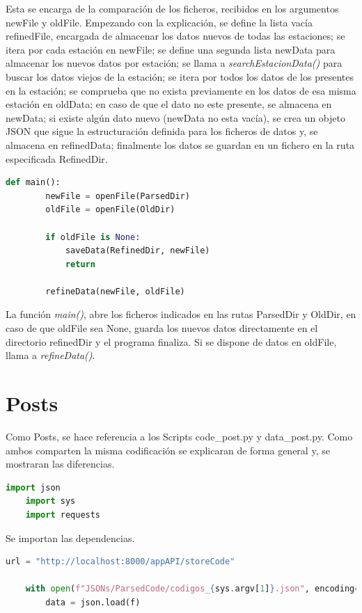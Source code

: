 Esta se encarga de la comparación de los ficheros, recibidos en los argumentos newFile y oldFile.\newline
\newline
Empezando con la explicación, se define la lista vacía refinedFile, encargada de almacenar los datos nuevos de todas las estaciones; se itera por cada estación en newFile; se define una segunda lista newData para almacenar los nuevos datos por estación; se llama a \textit{searchEstacionData()} para buscar los datos viejos de la estación; se itera por todos los datos de los presentes en la estación; se comprueba que no exista previamente en los datos de esa misma estación en oldData; en caso de que el dato no este presente, se almacena en newData; si existe algún dato nuevo (newData no esta vacía), se crea un objeto JSON que sigue la estructuración definida para los ficheros de datos y, se almacena en refinedData; finalmente los datos se guardan en un fichero en la ruta especificada RefinedDir.

\begin{lstlisting}[language=Python, caption={Declaración rutas JSONs}]
	def main():
		newFile = openFile(ParsedDir)
		oldFile = openFile(OldDir)
		
		if oldFile is None:
			saveData(RefinedDir, newFile)
			return
		
		refineData(newFile, oldFile)
\end{lstlisting}

La función \textit{main()}, abre los ficheros indicados en las rutas ParsedDir y OldDir, en caso de que oldFile sea None, guarda los nuevos datos directamente en el directorio refinedDir y el programa finaliza. Si se dispone de datos en oldFile, llama a \textit{refineData()}.

\section{Posts}
Como Posts, se hace referencia a los Scripts code\_post.py y data\_post.py. Como ambos comparten la misma codificación se explicaran de forma general y, se mostraran las diferencias.

\begin{lstlisting}[language=Python, caption={Import necesarios post}]
	import json
	import sys
	import requests
\end{lstlisting}

Se importan las dependencias.

\begin{lstlisting}[language=Python, caption={Declaración variables code\_post.py}]
	url = "http://localhost:8000/appAPI/storeCode"
	
	with open(f"JSONs/ParsedCode/codigos_{sys.argv[1]}.json", encoding="utf-8") as f:
		data = json.load(f)
\end{lstlisting}

